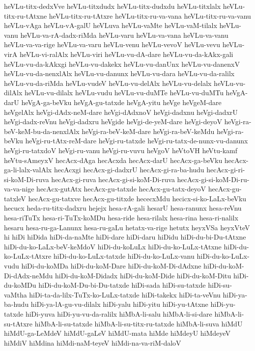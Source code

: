 {heVLu-titx-dedxVve
heVLu-titxdudx
heVLu-titx-dudxdu
heVLu-titxlalx
heVLu-titx-ru-tAtxne
heVLu-titx-ru-tAtxre
heVLu-titx-ru-va-vana
heVLu-titx-ru-va-vanu
heVLu-vAga
heVLu-vA-galU
heVLuva
heVLu-vaMte
heVLu-vaM-tilalx
heVLu-vanu
heVLu-va-rA-dadx-riMda
heVLu-varu
heVLu-va-vana
heVLu-va-vanu
heVLu-va-va-rige
heVLu-va-varu
heVLu-venu
heVLu-vevoV
heVLu-vevu
heVLu-virA
heVLu-vi-ralAlx
heVLu-viri
heVLu-vu-dA-dare
heVLu-vu-da-kAkx-gali
heVLu-vu-da-kAkxgi
heVLu-vu-dakekx
heVLu-vu-danUnx
heVLu-vu-danenxV
heVLu-vu-da-nenxlAlx
heVLu-vu-danunx
heVLu-vu-dara
heVLu-vu-da-ralilx
heVLu-vu-da-riMda
heVLu-vudeV
heVLu-vu-delAlx
heVLu-vu-delalx
heVLu-vu-dilAlx
heVLu-vu-dilalx
heVLu-vudu
heVLu-vu-duMTe
heVLu-vu-duMTu
heVgA-darU
heVgA-ga-beVku
heVgA-gu-tatxde
heVgA-yitu
heVge
heVgeM-dare
heVgelAlx
heVgi-dAdx-neM-dare
heVgi-dAdxnoV
heVgi-dadxnu
heVgi-dadxrU
heVgi-dadx-reVnu
heVgi-dadxru
heVgide
heVgi-de-yeM-dare
heVgi-deyoV
heVgi-ra-beV-keM-bu-da-nenxlAlx
heVgi-ra-beV-keM-dare
heVgi-ra-beV-keMdu
heVgi-ra-beVku
heVgi-ru-tAtx-reM-dare
heVgi-ru-tatxde
heVgi-ru-tatx-de-nunx-vu-danunx
heVgi-ru-tatxdoV
heVgi-ru-vanu
heVgi-ru-vuvu
heVgoV
heVtoVH
heVtu-kamf
heVtu-sAmeyxV
hecAcx-dAga
hecAcxda
hecAcx-darU
hecAcx-ga-beVku
hecAcx-ga-li-lalx-valAlx
hecAcxgi
hecAcx-gi-dadxrU
hecAcx-gi-ra-ba-hudu
hecAcx-gi-ri-si-koM-Di-ruva
hecAcx-gi-ruva
hecAcx-gi-si-koM-Di-ruva
hecAcx-gi-si-koM-Di-ru-va-va-nige
hecAcx-gutAtx
hecAcx-gu-tatxde
hecAcx-gu-tatx-deyoV
hecAcx-gu-tatxleV
hecAcx-gu-tatxve
hecAcx-gu-titxde
hececxMdu
hecicx-si-ko-LaLx-beVku
hecucx
heda-ru-titx-dadxru
hejejx
hesa-rA-gali
hesarU
hesa-ranunx
hesa-reVnu
hesa-riTuTx
hesa-ri-TuTx-koMDu
hesa-ride
hesa-rilalx
hesa-rina
hesa-ri-nalilx
hesaru
hesa-ru-ga-Lanunx
hesa-ru-gaLu
hetatx-va-rige
hetutx
heyxVSa
heyxVteV
hi
hiDi
hiDida
hiDi-da-naMte
hiDi-dare
hiDi-daru
hiDidu
hiDi-du-bi-Du-tAtxne
hiDi-du-ko-LaLx-beV-keMdoV
hiDi-du-koLuLx
hiDi-du-ko-LuLx-tAtxne
hiDi-du-ko-LuLx-tAtxre
hiDi-du-ko-LuLx-tatxde
hiDi-du-ko-LuLx-vanu
hiDi-du-ko-LuLx-vudu
hiDi-du-koMDa
hiDi-du-koM-Dare
hiDi-du-koM-Di-dAdxne
hiDi-du-koM-Di-dAdx-neMdu
hiDi-du-koM-Didadx
hiDi-du-koM-Dide
hiDi-du-koM-Ditu
hiDi-du-koMDu
hiDi-du-koM-Du-bi-Du-tatxde
hiDi-sada
hiDi-su-tatxde
hiDi-su-vaMtha
hiDi-ta-da-lilx-TuTx-ko-LuLx-tatxde
hiDi-takekx
hiDi-ta-veVnu
hiDi-ya-ba-hudu
hiDi-ya-lA-gu-vu-dilalx
hiDi-yalu
hiDi-yitu
hiDi-yu-tAtxne
hiDi-yu-tatxde
hiDi-yuva
hiDi-yu-vu-da-ralilx
hiMbA-li-salu
hiMbA-li-si-dare
hiMbA-li-su-tAtxre
hiMbA-li-su-tatxde
hiMbA-li-su-titx-ru-tatxde
hiMbA-li-suva
hiMdU
hiMdU-ga-LeMdeV
hiMdU-gaLeV
hiMdU-mata
hiMde
hiMdeyU
hiMdeyeV
hiMdiV
hiMdina
hiMdi-naM-teyeV
hiMdi-na-va-riM-daloV
}
